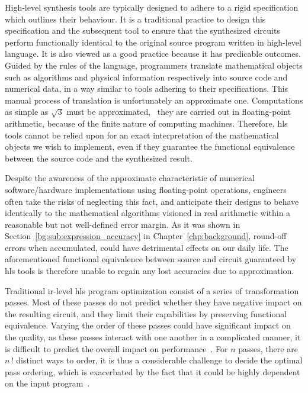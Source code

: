 High-level synthesis tools are typically designed to adhere to a rigid
specification which outlines their behaviour.  It is a traditional practice
to design this specification and the subsequent tool to ensure that the
synthesized circuits perform functionally identical to the original source
program written in high-level language.  It is also viewed as a good practice
because it has predicable outcomes.  Guided by the rules of the language,
programmers translate mathematical objects such as algorithms and physical
information respectively into source code and numerical data, in a way similar
to tools adhering to their specifications.  This manual process of translation
is unfortunately an approximate one.  Computations as simple as $\sqrt{3}$ must
be approximated, \eg~they are carried out in floating-point arithmetic, because
of the finite nature of computing machines.  Therefore, \gls{hls} tools cannot
be relied upon for an exact interpretation of the mathematical objects we wish
to implement, even if they guarantee the functional equivalence between the
source code and the synthesized result.

Despite the awareness of the approximate characteristic of numerical
software/hardware implementations using floating-point operations, engineers
often take the risks of neglecting this fact, and anticipate their designs to
behave identically to the mathematical algorithms visioned in real arithmetic
within a reasonable but not well-defined error margin.  As it was shown in
Section~\ref{bg:sub:expression_accuracy} in Chapter~\ref{chp:background},
round-off errors when accumulated, could have detrimental effects on our daily
life.  The aforementioned functional equivalence between source and circuit
guaranteed by \gls{hls} tools is therefore unable to regain any lost accuracies
due to approximation.

Traditional \gls{ir}-level \gls{hls} program optimization consist of a series
of transformation passes.  Most of these passes do not predict whether
they have negative impact on the resulting circuit, and they limit their
capabilities by preserving functional equivalence.  Varying the order of
these passes could have significant impact on the quality, as these passes
interact with one another in a complicated manner, it is difficult to predict
the overall impact on performance~\cite{huang15}.  For $n$ passes, there are
$n{\,!}$ distinct ways to order, it is thus a considerable challenge to decide
the optimal pass ordering, which is exacerbated by the fact that it could be
highly dependent on the input program~\cite{cong13}.

